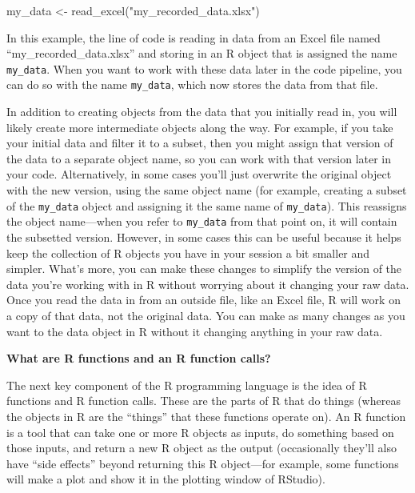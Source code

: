\documentclass[]{tufte-book}
\newenvironment{Shaded}{}{}
\newcommand{\FunctionTok}[1]{\textcolor[rgb]{0.02,0.16,0.49}{#1}}
\newcommand{\NormalTok}[1]{#1}
\newcommand{\OtherTok}[1]{\textcolor[rgb]{0.00,0.44,0.13}{#1}}
\newcommand{\StringTok}[1]{\textcolor[rgb]{0.25,0.44,0.63}{#1}}
\begin{document}
\begin{Shaded}
\begin{Highlighting}[]
\NormalTok{my\_data }\OtherTok{\textless{}{-}} \FunctionTok{read\_excel}\NormalTok{(}\StringTok{"my\_recorded\_data.xlsx"}\NormalTok{)}
\end{Highlighting}
\end{Shaded}

In this example, the line of code is reading in data from an Excel file named
``my\_recorded\_data.xlsx'' and storing in an R object that is assigned the name
\texttt{my\_data}. When you want to work with these data later in the code pipeline, you
can do so with the name \texttt{my\_data}, which now stores the data from that file.

In addition to creating objects from the data that you initially read in, you will
likely create more intermediate objects along the way. For example, if you take
your initial data and filter it to a subset, then you might assign that version
of the data to a separate object name, so you can work with that version later in
your code. Alternatively, in some cases you'll just overwrite the original object
with the new version, using the same object name (for example, creating a subset of
the \texttt{my\_data} object and assigning it the same name of \texttt{my\_data}). This reassigns the
object name---when you refer to \texttt{my\_data} from that point on, it will contain the
subsetted version. However, in some cases this can be useful because it helps keep
the collection of R objects you have in your session a bit smaller and simpler. What's
more, you can make these changes to simplify the version of the data you're working
with in R without worrying about it changing your raw data. Once you read the data
in from an outside file, like an Excel file, R will work on a copy of that data, not
the original data. You can make as many changes as you want to the data object in R
without it changing anything in your raw data.

\textbf{What are R functions and an R function calls?}

The next key component of the R programming language is the idea of R functions
and R function calls. These are the parts of R that do things (whereas the objects in R
are the ``things'' that these functions operate on). An R function is a tool that can
take one or more R objects as inputs, do something based on those inputs, and return a
new R object as the output (occasionally they'll also have ``side effects'' beyond returning
this R object---for example, some functions will make a plot and show it in the plotting
window of RStudio).
\end{document}
